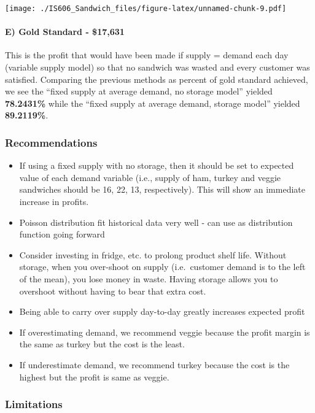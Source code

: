 \documentclass[]{article}
\begin{document}
\texttt{[image: ./IS606\_Sandwich\_files/figure-latex/unnamed-chunk-9.pdf]}

\paragraph{E) Gold Standard - \$17,631}\label{e-gold-standard---17631}

This is the profit that would have been made if supply = demand each day
(variable supply model) so that no sandwich was wasted and every
customer was satisfied. Comparing the previous methods as percent of
gold standard achieved, we see the ``fixed supply at average demand, no
storage model'' yielded \textbf{78.2431\%} while the ``fixed supply at
average demand, storage model'' yielded \textbf{89.2119\%}.

\subsubsection{Recommendations}\label{recommendations}

\begin{itemize}
\itemsep1pt\parskip0pt
\item
  If using a fixed supply with no storage, then it should be set to
  expected value of each demand variable (i.e., supply of ham, turkey
  and veggie sandwiches should be 16, 22, 13, respectively). This will
  show an immediate increase in profits.
\item
  Poisson distribution fit historical data very well - can use as
  distribution function going forward
\item
  Consider investing in fridge, etc. to prolong product shelf life.
  Without storage, when you over-shoot on supply (i.e.~customer demand
  is to the left of the mean), you lose money in waste. Having storage
  allows you to overshoot without having to bear that extra cost.
\item
  Being able to carry over supply day-to-day greatly increases expected
  profit
\item
  If overestimating demand, we recommend veggie because the profit
  margin is the same as turkey but the cost is the least.
\item
  If underestimate demand, we recommend turkey because the cost is the
  highest but the profit is same as veggie.
\end{itemize}

\subsubsection{Limitations}\label{limitations}
\end{document}
